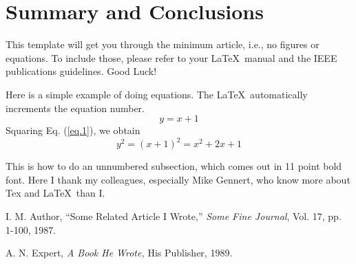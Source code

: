 \documentclass[a4paper]{ICAR2003}
\begin{document}
\section{Summary and Conclusions}
This template will get you through the minimum article, i.e., no figures or
equations.  To include those, please refer to your \LaTeX\ manual and the IEEE
publications guidelines.  Good Luck!

Here is a simple example of doing equations.
The \LaTeX\ automatically increments the equation number.
\begin{equation}
y = x + 1
\label{eq.1}  %
\end{equation}
Squaring Eq. (\ref{eq.1}), we obtain 
\begin{equation}
y^2 = (x + 1)^2 = x^2 + 2x +1
\label{eq.2}
\end{equation}


\begin{Acknowledgment}
This is how to do an unnumbered subsection, which comes out in 11 point bold
font.  Here I thank my colleagues, especially Mike Gennert, who know more 
about Tex and \LaTeX\ than I.
\end{Acknowledgment}

\begin{thebibliography}{9}
I. M. Author, 
``Some Related Article I Wrote,''
{\em Some Fine Journal}, Vol. 17, pp. 1-100, 1987.

A. N. Expert, 
{\em A Book He Wrote,}
His Publisher, 1989.
\end{thebibliography}
\end{document}
